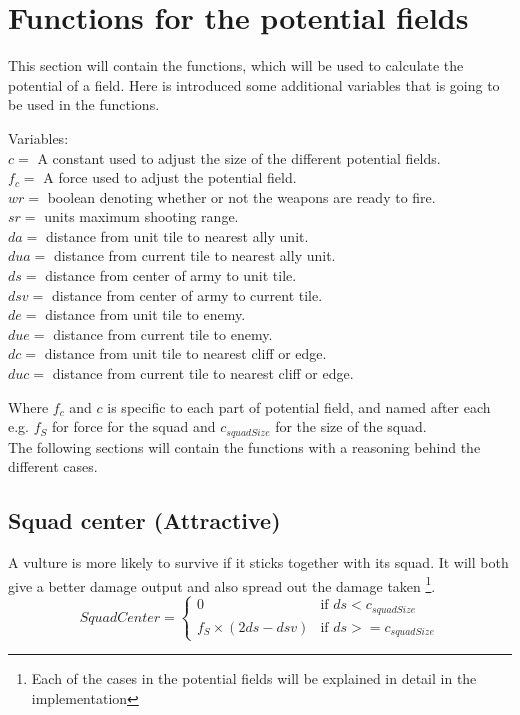\section{Functions for the potential fields}
	This section will contain the functions, which will be used to calculate the potential of a field. Here is introduced some additional variables that 
	is going to be used in the functions.
	
	\label{cha3_variables}
	Variables:\\
	$c =$ A constant used to adjust the size of the different potential fields.\\ 
	$f_c =$ A force used to adjust the potential field.\\
	$wr =$ boolean denoting whether or not the weapons are ready to fire.\\
	$sr =$ units maximum shooting range.\\
	$da =$ distance from unit tile to nearest ally unit.\\
	$dua =$ distance from current tile to nearest ally unit.\\
	$ds =$ distance from center of army to unit tile.\\
	$dsv =$ distance from center of army to current tile.\\
	$de =$ distance from unit tile to enemy.\\
	$due =$ distance from current tile to enemy.\\
	$dc =$ distance from unit tile to nearest cliff or edge. \\
	$duc =$ distance from current tile to nearest cliff or edge. 
	
	
	
	Where $f_c$ and $c$ is specific to each part of potential field, and named after each e.g. $f_{S}$ for force for the squad and $c_{squadSize}$ for the size of the squad.\\
	
	The following sections will contain the functions with a reasoning behind the different cases.
	
	\subsection*{Squad center (Attractive)}
		\label{SCA_label}A vulture is more likely to survive if it sticks together with its squad. 
		It will both give a better damage output and also spread out the damage taken
		\footnote{Each of the cases in the potential fields will be explained in detail in the implementation}.
		\begin{displaymath}
			SquadCenter  = \begin{cases}
					0 & \text{if } ds < c_{squadSize} \\
					f_{S} \times (2ds - dsv) & \text{if } ds >= c_{squadSize}
				\end{cases}		
		\end{displaymath}
		
